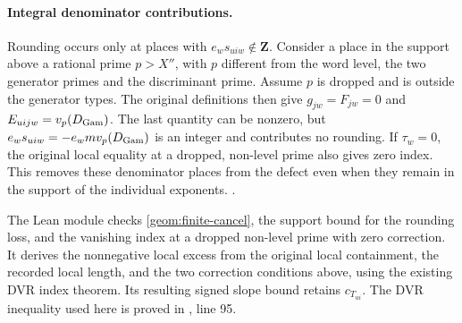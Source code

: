\paragraph{Integral denominator contributions.}
Rounding occurs only at places with \(e_ws_{uiw}\notin\mathbf Z\).
Consider a place in the support above a rational prime
\(p>X''\), with \(p\) different from the word level, the two generator
primes and the discriminant prime. Assume \(p\) is dropped and is
outside the generator types. The original definitions then give
\(g_{jw}=F_{jw}=0\) and \(E_{uijw}=v_p(D_{\rm Gam})\). The last
quantity can be nonzero, but \(e_ws_{uiw}=-e_wm v_p(D_{\rm Gam})\)
is an integer and contributes no rounding. If \(\tau_w=0\), the
original local equality at a dropped, non-level prime also gives
zero index. This removes these denominator places from the defect
even when they remain in the support of the individual exponents.
.

The Lean module  checks
\eqref{geom:finite-cancel}, the support bound for the rounding loss,
and the vanishing index at a dropped non-level prime with zero
correction. It derives the nonnegative local excess from the original
local containment, the recorded local length, and the two correction
conditions above, using the existing DVR index theorem. Its resulting
signed slope bound retains \(c_{T_{ui}}\).
The DVR inequality used here is proved in
, line 95.
